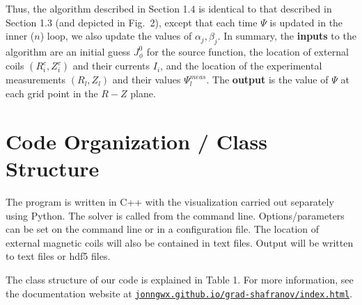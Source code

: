\documentclass[paper=letter, fontsize=11pt]{scrartcl} %
\begin{document}
Thus, the algorithm described in Section 1.4 is identical to that described in Section 1.3 (and depicted in Fig.~2), except that each time $\Psi$ is updated in the inner ($n$) loop, we also update the values of $\alpha_j, \beta_j$.  In summary, the \textbf{inputs} to the algorithm are an initial guess $J_\phi^0$ for the source function, the location of external coils $(R_i^c,Z_i^c)$ and their currents $I_i$, and the location of the experimental measurements $(R_l,Z_l)$ and their values $\Psi_l^{meas}$.  The \textbf{output} is the value of $\Psi$ at each grid point in the $R-Z$ plane.  



\qedsymbol
\section{Code Organization / Class Structure}

The program is written in C++ with the visualization carried out separately using Python. The solver is called from the command line.  Options/parameters can be set on the command line or in a configuration file.  The location of external magnetic coils will also be contained in text files. Output will be written to text files or hdf5 files. 

The class structure of our code is explained in Table 1.  For more information, see the documentation website at \href{http://jonngwx.github.io/grad-shafranov/index.html}{\nolinkurl{jonngwx.github.io/grad-shafranov/index.html}}.
\\ \\
\end{document}
